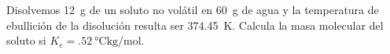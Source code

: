 Disolvemos \SI{12}{\gram} de un soluto no volátil en \SI{60}{\gram} de agua y la temperatura de ebullición de la disolución resulta ser \SI{374,45}{\kelvin}. Calcula la masa molecular del soluto si $K_e=\SI{,52}{\celsius\kilogram\per\mol}$.
